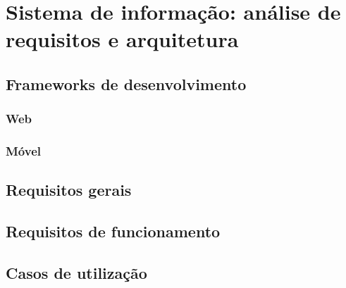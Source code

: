 \chapter{Sistema de informação: análise de requisitos e arquitetura}


\section{Frameworks de desenvolvimento}

\subsection{Web}

\subsection{Móvel}


\section{Requisitos gerais}



\section{Requisitos de funcionamento}


\section{Casos de utilização}